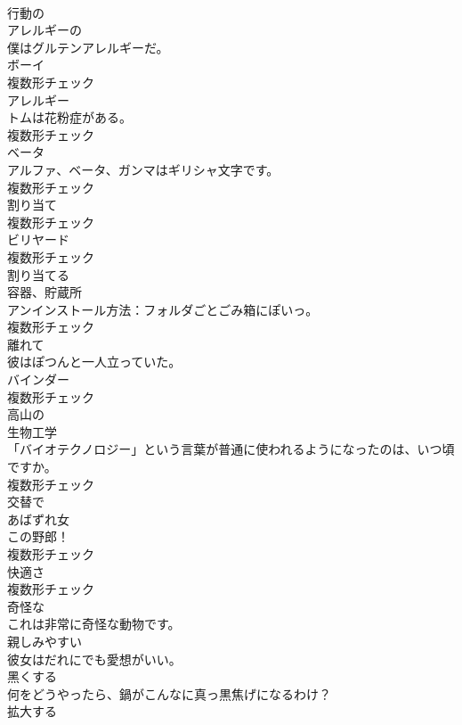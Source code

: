 \documentclass[8pt]{extreport}
\begin{document}
\begin{CJK}{UTF8}{min}
\\	[形容詞]	行動の	
\\	[形容詞]	アレルギーの	
\\	僕はグルテンアレルギーだ。	
\\	[名詞]	ボーイ	
\\	複数形チェック
\\	[名詞]	アレルギー	
\\	トムは花粉症がある。	
\\	複数形チェック
\\	[名詞]	ベータ	
\\	アルファ、ベータ、ガンマはギリシャ文字です。	
\\	複数形チェック
\\	[名詞]	割り当て	
\\	複数形チェック
\\	[名詞]	ビリヤード	
\\	複数形チェック
\\	[動詞]	割り当てる	
\\	[名詞]	容器、貯蔵所	
\\	アンインストール方法：フォルダごとごみ箱にぽいっ。	
\\	複数形チェック
\\	[形容詞]	離れて	
\\	彼はぽつんと一人立っていた。	
\\	[名詞]	バインダー	
\\	複数形チェック
\\	[形容詞]	高山の	
\\	[名詞]	生物工学	
\\	「バイオテクノロジー」という言葉が普通に使われるようになったのは、いつ頃ですか。	
\\	複数形チェック
\\	[副詞]	交替で	
\\	[名詞]	あばずれ女	
\\	この野郎！	
\\	複数形チェック
\\	[名詞]	快適さ	
\\	複数形チェック
\\	[形容詞]	奇怪な	
\\	これは非常に奇怪な動物です。	
\\	[形容詞]	親しみやすい	
\\	彼女はだれにでも愛想がいい。	
\\	[動詞]	黑くする	
\\	何をどうやったら、鍋がこんなに真っ黒焦げになるわけ？	
\\	[動詞]	拡大する	

\end{CJK}
\end{document}
